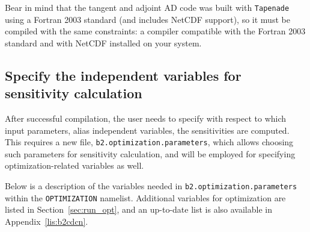 Bear in mind that the tangent and adjoint AD code was built with {\tt Tapenade} using a Fortran 2003 standard (and includes NetCDF support), so it must be compiled with the same constraints: a compiler compatible with the Fortran 2003 standard and with NetCDF installed on your system.

\subsection{Specify the independent variables for sensitivity calculation}\label{sec:sensitivity_parameters}
After successful compilation, the user needs to specify with respect to which input parameters, alias independent variables, the sensitivities are computed. This requires a new file, {\tt b2.optimization.parameters}, which allows choosing such parameters for sensitivity calculation, and will be employed for specifying optimization-related variables as well.

Below is a description of the variables needed in {\tt b2.optimization.parameters} within the {\tt OPTIMIZATION} namelist. Additional variables for optimization are listed in Section~\ref{sec:run_opt}, and an up-to-date list is also available in Appendix~\ref{lis:b2cdcn}.

